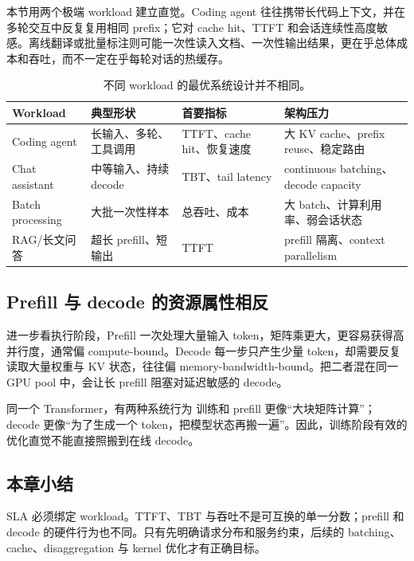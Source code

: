 本节用两个极端 workload 建立直觉。Coding agent 往往携带长代码上下文，并在多轮交互中反复复用相同 prefix；它对 cache hit、TTFT 和会话连续性高度敏感。离线翻译或批量标注则可能一次性读入文档、一次性输出结果，更在乎总体成本和吞吐，而不一定在乎每轮对话的热缓存。

\begin{table}[H]
\centering
\begin{tabular}{L{0.18\textwidth}L{0.22\textwidth}L{0.24\textwidth}L{0.22\textwidth}}
\toprule
Workload & 典型形状 & 首要指标 & 架构压力 \\
\midrule
Coding agent & 长输入、多轮、工具调用 & TTFT、cache hit、恢复速度 & 大 KV cache、prefix reuse、稳定路由 \\
Chat assistant & 中等输入、持续 decode & TBT、tail latency & continuous batching、decode capacity \\
Batch processing & 大批一次性样本 & 总吞吐、成本 & 大 batch、计算利用率、弱会话状态 \\
RAG/长文问答 & 超长 prefill、短输出 & TTFT & prefill 隔离、context parallelism \\
\bottomrule
\end{tabular}
\caption{不同 workload 的最优系统设计并不相同。}
\end{table}


\subsection{Prefill 与 decode 的资源属性相反}

进一步看执行阶段，Prefill 一次处理大量输入 token，矩阵乘更大，更容易获得高并行度，通常偏 compute-bound。Decode 每一步只产生少量 token，却需要反复读取大量权重与 KV 状态，往往偏 memory-bandwidth-bound。把二者混在同一 GPU pool 中，会让长 prefill 阻塞对延迟敏感的 decode。

\begin{importantbox}{同一个 Transformer，有两种系统行为}
训练和 prefill 更像“大块矩阵计算”；decode 更像“为了生成一个 token，把模型状态再搬一遍”。因此，训练阶段有效的优化直觉不能直接照搬到在线 decode。
\end{importantbox}

\subsection{本章小结}

SLA 必须绑定 workload。TTFT、TBT 与吞吐不是可互换的单一分数；prefill 和 decode 的硬件行为也不同。只有先明确请求分布和服务约束，后续的 batching、cache、disaggregation 与 kernel 优化才有正确目标。

